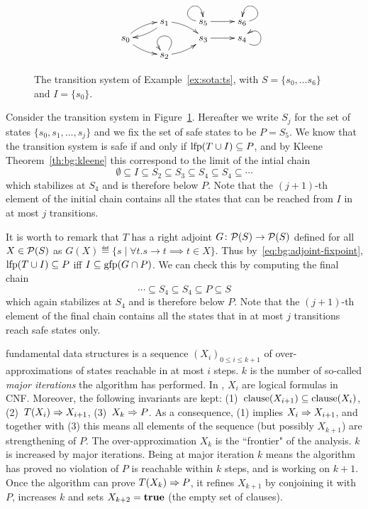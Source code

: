 \begin{example}\label{ex:sota:ts}
	\begin{figure}[t]
		\begin{displaymath}
			\xymatrix@R=5pt{
			& s_1 \ar@/^1ex/[rd] \ar@/^1ex/[ld] &  s_5 \ar@(l,u)\ar[r] & s_6 \ar@(r,u)\\
			s_0 \ar@/^1ex/[ur] \ar@/_1ex/[rd] & &s_3 \ar[r]& s_4\ar@(rd,ur) \\
			& s_2 \ar@(ur,ul) \ar@/_1ex/[ru] &
			}
		\end{displaymath}
		\caption{The transition system of Example~\ref{ex:sota:ts}, with $S = \{ s_0, \dots s_6 \}$ and $I=\{s_0\}$.}\label{fig:sota:ts}
	\end{figure}

	Consider the transition system in Figure~\ref{fig:sota:ts}. Hereafter we write $S_{j}$ for the set of states $\{s_0, s_1, \dots, s_j\}$ and we fix the set of safe states to be $P = S_5$.
	We know that the transition system is safe if and only if $\text{lfp}(T \cup I) \subseteq P$, and by Kleene Theorem~\ref{th:bg:kleene} this correspond to the limit of the intial chain
	\[
	\emptyset \subseteq  I \subseteq S_2 \subseteq S_3 \subseteq S_4 \subseteq S_4 \subseteq \cdots
	\]
	which stabilizes at $S_4$ and is therefore below $P$. Note that the $(j+1)$-th element of the initial chain contains all the states that can be reached from $I$ in at most $j$ transitions.

	It is worth to remark that $T$ has a right adjoint $G \colon \mathcal{P}(S) \to \mathcal{P}(S)$ defined for all $X \in \mathcal{P}(S)$ as $G(X) \eqdef \{s \mid \forall t. s \rightarrow t \implies t \in X \}$. Thus by~\eqref{eq:bg:adjoint-fixpoint}, $\text{lfp} (T \cup I) \subseteq P$ iff $I \subseteq \text{gfp} (G \cap P)$. We can check this by computing the final chain
	\[
	\cdots \subseteq S_4 \subseteq S_4 \subseteq P \subseteq S
	\]
	which again stabilizes at $S_4$ and is therefore below $P$. Note that the $(j+1)$-th element of the final chain contains all the states that in at most $j$ transitions reach safe states only.
\end{example}

 fundamental data structures is a sequence $(X_i)_{0 \le i \le k + 1}$ of over-approximations of states reachable in at most $i$ steps. $k$ is the number of so-called \emph{major iterations} the algorithm has performed.
In , $X_i$ are logical formulas in CNF. Moreover, the following invariants are kept: (1)~$\text{clause}(X_{i+1}) \subseteq \text{clause}(X_i)$, (2)~$T(X_i) \Rightarrow X_{i+1}$, (3)~$X_{k} \Rightarrow P$.
As a consequence, (1) implies $X_i \Rightarrow X_{i+1}$, and together with (3) this means all elements of the sequence (but possibly $X_{k+1}$) are strengthening of $P$. The over-approximation $X_k$ is the ``frontier" of the analysis. $k$ is increased by major iterations. Being at major iteration $k$ means the algorithm has proved no violation of $P$ is reachable within $k$ steps, and is working on $k + 1$. Once the algorithm can prove $T(X_k) \Rightarrow P$, it refines $X_{k+1}$ by conjoining it with $P$, increases $k$ and sets $X_{k+2} = \textbf{true}$ (the empty set of clauses).

